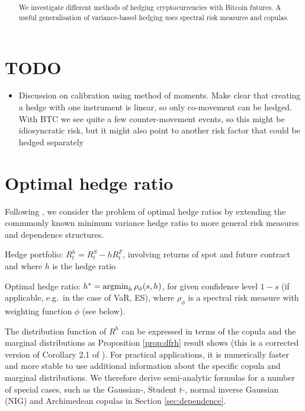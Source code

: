 \documentclass[square]{article} %
\theoremstyle{plain}
\theoremstyle{definition} %
\begin{document}
\setlength{\boxlength}{0.95\textwidth} %
\title{\large{\bf{}}} %
\author{{\normalsize\bf{}}}%
\thispagestyle{empty}
\addtocounter{page}{1}
\maketitle
\begin{abstract}
  We investigate different methods of hedging cryptocurrencies with
  Bitcoin futures. A useful generalisation of variance-based hedging
  uses spectral risk measures and copulas. 
\end{abstract}
\vspace{.5cm}
\def\contentsname{Contents}
\tableofcontents
\vspace{.5cm}

\section{TODO}
\label{sec:todo}

\begin{itemize}
\item Discussion on calibration using method of moments. Make clear
  that creating a hedge with one instrument is linear, so only
  co-movement can be hedged. With BTC we see quite a few
  counter-movement events, so this might be idiosyncratic risk, but it
  might also point to another risk factor that could be hedged separately
\end{itemize}

\section{Optimal hedge ratio}
\label{sec:optimal-hedge-ratio}

Following \citep{Barbi2014}, we consider the problem of optimal
hedge ratios by extending the commmonly known minimum variance hedge
ratio to more general risk measures and dependence
structures.\medskip

Hedge portfolio: $R_t^h = R_t^S - h R_t^F$, involving returns of spot
and future contract and where $h$ is the hedge ratio

Optimal hedge ratio: $h^\ast = \argmin_h \rho_\phi(s,h)$, for given
confidence level $1-s$ (if applicable, e.g.\ in the case of VaR, ES),
where $\rho_\phi$ is a spectral risk measure with weighting function
$\phi$ (see below).

The distribution function of $R^h$ can be expressed in terms of the
copula and the marginal distributions as Proposition \ref{prop:dfrh}
result shows (this is a corrected version of Corollary 2.1 of
\citep{Barbi2014}). For practical applications, it is numerically
faster and more stable to use additional information about the
specific copula and marginal distributions. We therefore derive
semi-analytic formulas for a number of special cases, such as the
Gaussian-, Student $t$-, normal inverse Gaussian (NIG) and Archimedean
copulas in Section \ref{sec:dependence}.
\end{document}
